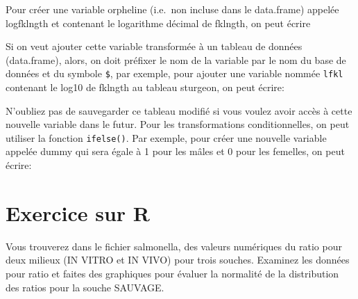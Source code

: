 \documentclass[12pt,]{book}
\makeatletter
\newenvironment{Shaded}{\begin{snugshade}}{\end{snugshade}}
\newcommand{\DecValTok}[1]{\textcolor[rgb]{0.06,0.06,0.06}{#1}}
\newcommand{\KeywordTok}[1]{\textcolor[rgb]{0.27,0.27,0.27}{\textbf{#1}}}
\newcommand{\NormalTok}[1]{#1}
\newcommand{\OperatorTok}[1]{\textcolor[rgb]{0.43,0.43,0.43}{\textbf{#1}}}
\newcommand{\StringTok}[1]{\textcolor[rgb]{0.5,0.5,0.5}{#1}}
\newenvironment{kframe}{%
\medskip{}
\setlength{\fboxsep}{.8em}
 \def\at@end@of@kframe{}%
 \ifinner\ifhmode%
  \def\at@end@of@kframe{\end{minipage}}%
  \begin{minipage}{\columnwidth}%
 \fi\fi%
 \def\FrameCommand##1{\hskip\@totalleftmargin \hskip-\fboxsep
 \colorbox{shadecolor}{##1}\hskip-\fboxsep
     \hskip-\linewidth \hskip-\@totalleftmargin \hskip\columnwidth}%
 \MakeFramed {\advance\hsize-\width
   \@totalleftmargin\z@ \linewidth\hsize
   \@setminipage}}%
 {\par\unskip\endMakeFramed%
 \at@end@of@kframe}
\newenvironment{rmdblock}[1]
  {
  \begin{itemize}
  \renewcommand{\labelitemi}{
    \raisebox{-.7\height}[0pt][0pt]{
      {\setkeys{Gin}{width=3em,keepaspectratio}\texttt{[image: images/\#1]}}
    }
  }
  \setlength{\fboxsep}{1em}
  \begin{kframe}
  \item
  }
  {
  \end{kframe}
  \end{itemize}
  }
\newenvironment{rmdcode}
  {\begin{rmdblock}{screen}}
  {\end{rmdblock}}
\makeatother
\begin{document}
Pour créer une variable orpheline (i.e.~non incluse dans le data.frame) appelée logfklngth et contenant le logarithme décimal de fklngth, on peut écrire

\begin{Shaded}
\end{Shaded}

Si on veut ajouter cette variable transformée à un tableau de données (data.frame), alors, on doit préfixer le nom de la variable par le nom du base de données et du symbole \texttt{\$}, par exemple, pour ajouter une variable nommée \texttt{lfkl} contenant le log10 de fklngth au tableau sturgeon, on peut écrire:

\begin{Shaded}
\end{Shaded}

N'oubliez pas de sauvegarder ce tableau modifié si vous voulez avoir accès à cette nouvelle variable dans le futur.
Pour les transformations conditionnelles, on peut utiliser la fonction \texttt{ifelse()}.
Par exemple, pour créer une nouvelle variable appelée dummy qui sera égale à 1 pour les mâles et 0 pour les femelles, on peut écrire:

\begin{Shaded}
\end{Shaded}

\hypertarget{exercice-sur-r}{%
\section{Exercice sur R}\label{exercice-sur-r}}

\begin{rmdcode}
Vous trouverez dans le fichier salmonella, des valeurs numériques du ratio pour deux milieux (IN VITRO et IN VIVO) pour trois souches.
Examinez les données pour ratio et faites des graphiques pour évaluer la normalité de la distribution des ratios pour la souche SAUVAGE.
\end{rmdcode}
\end{document}
